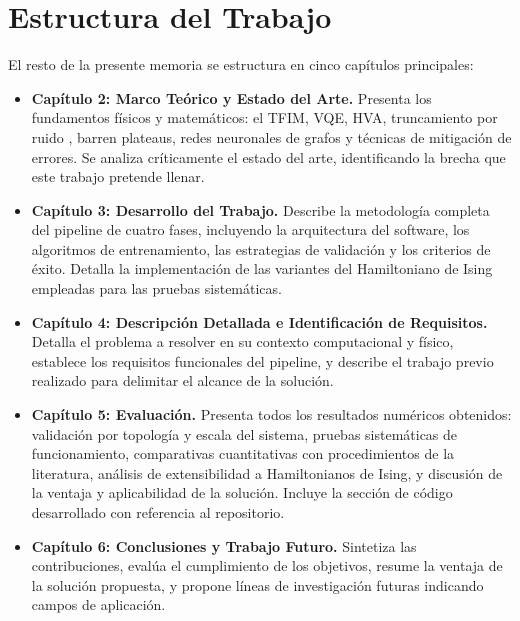 \documentclass[11pt,a4paper,spanish]{book}
\begin{document}
\section{Estructura del Trabajo}

El resto de la presente memoria se estructura en cinco capítulos principales:

\begin{itemize}
    \item \textbf{Capítulo 2: Marco Teórico y Estado del Arte.} Presenta los fundamentos físicos y matemáticos: el TFIM, VQE, HVA, truncamiento por ruido \citep{mele2026}, barren plateaus, redes neuronales de grafos y técnicas de mitigación de errores. Se analiza críticamente el estado del arte, identificando la brecha que este trabajo pretende llenar.

    \item \textbf{Capítulo 3: Desarrollo del Trabajo.} Describe la metodología completa del pipeline de cuatro fases, incluyendo la arquitectura del software, los algoritmos de entrenamiento, las estrategias de validación y los criterios de éxito. Detalla la implementación de las variantes del Hamiltoniano de Ising empleadas para las pruebas sistemáticas.

    \item \textbf{Capítulo 4: Descripción Detallada e Identificación de Requisitos.} Detalla el problema a resolver en su contexto computacional y físico, establece los requisitos funcionales del pipeline, y describe el trabajo previo realizado para delimitar el alcance de la solución.

    \item \textbf{Capítulo 5: Evaluación.} Presenta todos los resultados numéricos obtenidos: validación por topología y escala del sistema, pruebas sistemáticas de funcionamiento, comparativas cuantitativas con procedimientos de la literatura, análisis de extensibilidad a Hamiltonianos de Ising, y discusión de la ventaja y aplicabilidad de la solución. Incluye la sección de código desarrollado con referencia al repositorio.

    \item \textbf{Capítulo 6: Conclusiones y Trabajo Futuro.} Sintetiza las contribuciones, evalúa el cumplimiento de los objetivos, resume la ventaja de la solución propuesta, y propone líneas de investigación futuras indicando campos de aplicación.
\end{itemize}


\end{document}
